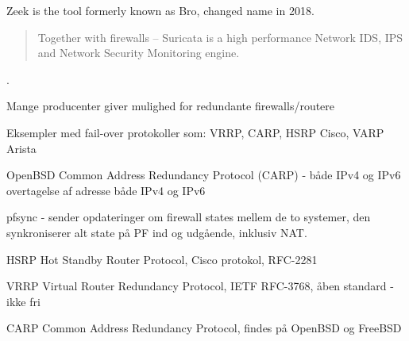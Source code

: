 \documentclass[Screen16to9,17pt]{foils}
\begin{document}
Zeek is the tool formerly known as Bro, changed name in 2018. 




\begin{quote}
Together with firewalls -- Suricata is a high performance Network IDS, IPS and Network Security Monitoring engine.
\end{quote}




.

\begin{list2}
\item Mange producenter giver mulighed for redundante firewalls/routere
\item Eksempler med fail-over protokoller som: VRRP, CARP, HSRP Cisco, VARP Arista
\item OpenBSD Common Address Redundancy Protocol (CARP) - både IPv4 og IPv6\\
overtagelse af adresse både IPv4 og IPv6
\item pfsync - sender opdateringer om firewall states mellem de to systemer, den synkroniserer alt state på PF ind og udgående, inklusiv NAT.
\end{list2}




\begin{list1}
\item HSRP Hot Standby Router Protocol, Cisco protokol, RFC-2281
\item VRRP Virtual Router Redundancy Protocol, IETF RFC-3768, åben standard - ikke fri
\item CARP Common Address Redundancy Protocol, findes på OpenBSD og FreeBSD
\item {}
\end{list1}


\slidenext
\end{document}
